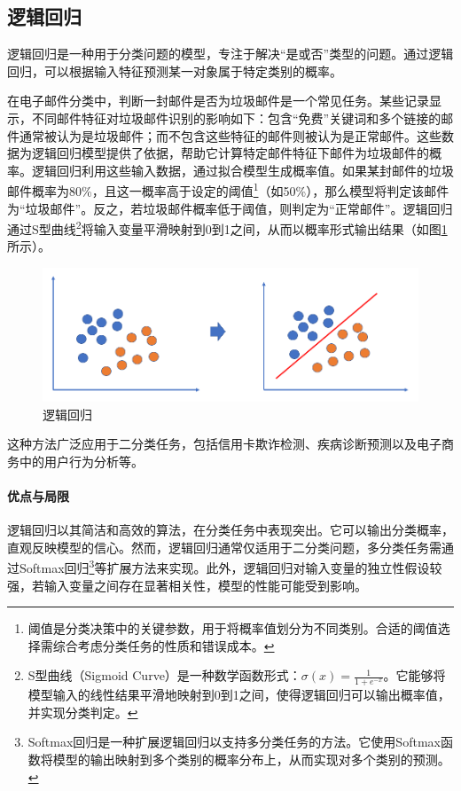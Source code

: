 \subsection{逻辑回归}

逻辑回归是一种用于分类问题的模型，专注于解决“是或否”类型的问题。通过逻辑回归，可以根据输入特征预测某一对象属于特定类别的概率。

在电子邮件分类中，判断一封邮件是否为垃圾邮件是一个常见任务。某些记录显示，不同邮件特征对垃圾邮件识别的影响如下：包含“免费”关键词和多个链接的邮件通常被认为是垃圾邮件；而不包含这些特征的邮件则被认为是正常邮件。这些数据为逻辑回归模型提供了依据，帮助它计算特定邮件特征下邮件为垃圾邮件的概率。逻辑回归利用这些输入数据，通过拟合模型生成概率值。如果某封邮件的垃圾邮件概率为80\%，且这一概率高于设定的阈值\footnote{阈值是分类决策中的关键参数，用于将概率值划分为不同类别。合适的阈值选择需综合考虑分类任务的性质和错误成本。}（如50\%），那么模型将判定该邮件为“垃圾邮件”。反之，若垃圾邮件概率低于阈值，则判定为“正常邮件”。逻辑回归通过S型曲线\footnote{S型曲线（Sigmoid Curve）是一种数学函数形式：\( \sigma(x) = \frac{1}{1 + e^{-x}} \)。它能够将模型输入的线性结果平滑地映射到0到1之间，使得逻辑回归可以输出概率值，并实现分类判定。}将输入变量平滑映射到0到1之间，从而以概率形式输出结果（如图\ref{fig:逻辑回归}所示）。

\begin{figure}[H]
    \centering
    \includegraphics[width=0.8\linewidth]{image/2/逻辑回归.png}
    \caption{逻辑回归}
    \label{fig:逻辑回归}
\end{figure}

这种方法广泛应用于二分类任务，包括信用卡欺诈检测、疾病诊断预测以及电子商务中的用户行为分析等。

\paragraph{优点与局限}  

逻辑回归以其简洁和高效的算法，在分类任务中表现突出。它可以输出分类概率，直观反映模型的信心。然而，逻辑回归通常仅适用于二分类问题，多分类任务需通过Softmax回归\footnote{Softmax回归是一种扩展逻辑回归以支持多分类任务的方法。它使用Softmax函数将模型的输出映射到多个类别的概率分布上，从而实现对多个类别的预测。}等扩展方法来实现。此外，逻辑回归对输入变量的独立性假设较强，若输入变量之间存在显著相关性，模型的性能可能受到影响。



